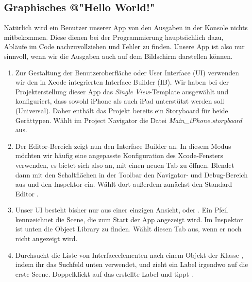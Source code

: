 \documentclass[parskip=half, final]{scrreprt}
\begin{document}
\begin{lecture} %


\section{Graphisches @"Hello World!"{}}

Natürlich wird ein Benutzer unserer App von den Ausgaben in der Konsole nichts mitbekommen. Diese dienen bei der Programmierung hauptsächlich dazu, Abläufe im Code nachzuvollziehen und Fehler zu finden. Unsere App ist also nur sinnvoll, wenn wir die Ausgaben auch auf dem Bildschirm darstellen können.

\begin{enumerate}

\item Zur Gestaltung der Benutzeroberfläche oder User Interface (UI) verwenden wir den in Xcode integrierten Interface Builder (IB). Wir haben bei der Projekterstellung dieser App das \emph{Single View}-Template ausgewählt und konfiguriert, dass sowohl iPhone als auch iPad unterstützt werden soll (Universal). Daher enthält das Projekt bereits ein Storyboard für beide Gerättypen. Wählt im Project Navigator die Datei \emph{Main\_iPhone.storyboard} aus.

\item Der Editor-Bereich zeigt nun den Interface Builder an. In diesem Modus möchten wir häufig eine angepasste Konfiguration des Xcode-Fensters verwenden, es bietet sich also an, mit  einen neuen Tab zu öffnen. Blendet dann mit den Schaltflächen in der Toolbar den Navigator- und Debug-Bereich aus und den Inspektor ein. Wählt dort außerdem zunächst den Standard-Editor .


\item Unser UI besteht bisher nur aus einer einzigen Ansicht, oder . Ein Pfeil kennzeichnet die Scene, die zum Start der App angezeigt wird. Im Inspektor ist unten die Object Library zu finden. Wählt diesen Tab aus, wenn er noch nicht angezeigt wird.

\item Durchsucht die Liste von Interfaceelementen nach einem Objekt der Klasse , indem ihr das Suchfeld unten verwendet, und zieht ein Label irgendwo auf die erste Scene. Doppelklickt auf das erstellte Label und tippt .


\end{enumerate}
\end{lecture}
\end{document}
